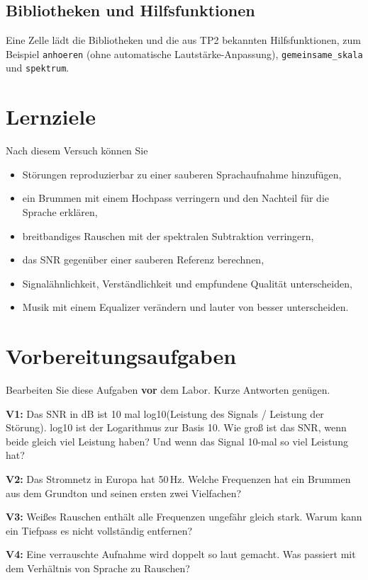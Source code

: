 \documentclass[11pt]{article}
\begin{document}
\subsection{Bibliotheken und Hilfsfunktionen}

Eine Zelle lädt die Bibliotheken und die aus TP2 bekannten Hilfsfunktionen, zum Beispiel \texttt{anhoeren} (ohne automatische Lautstärke-Anpassung), \texttt{gemeinsame\_skala} und \texttt{spektrum}.

\section{Lernziele}

Nach diesem Versuch können Sie
\begin{itemize}
  \item Störungen reproduzierbar zu einer sauberen Sprachaufnahme hinzufügen,
  \item ein Brummen mit einem Hochpass verringern und den Nachteil für die Sprache erklären,
  \item breitbandiges Rauschen mit der spektralen Subtraktion verringern,
  \item das SNR gegenüber einer sauberen Referenz berechnen,
  \item Signalähnlichkeit, Verständlichkeit und empfundene Qualität unterscheiden,
  \item Musik mit einem Equalizer verändern und lauter von besser unterscheiden.
\end{itemize}

\bigskip
\section{Vorbereitungsaufgaben}

Bearbeiten Sie diese Aufgaben \textbf{vor} dem Labor. Kurze Antworten genügen.

\begin{block}
\textbf{V1:} Das SNR in dB ist 10 mal log10(Leistung des Signals / Leistung der Störung). log10 ist der Logarithmus zur Basis 10. Wie groß ist das SNR, wenn beide gleich viel Leistung haben? Und wenn das Signal 10-mal so viel Leistung hat?
\end{block}
\begin{block}
\textbf{V2:} Das Stromnetz in Europa hat 50\,Hz. Welche Frequenzen hat ein Brummen aus dem Grundton und seinen ersten zwei Vielfachen?
\end{block}
\begin{block}
\textbf{V3:} Weißes Rauschen enthält alle Frequenzen ungefähr gleich stark. Warum kann ein Tiefpass es nicht vollständig entfernen?
\end{block}
\begin{block}
\textbf{V4:} Eine verrauschte Aufnahme wird doppelt so laut gemacht. Was passiert mit dem Verhältnis von Sprache zu Rauschen?
\end{block}
\end{document}
